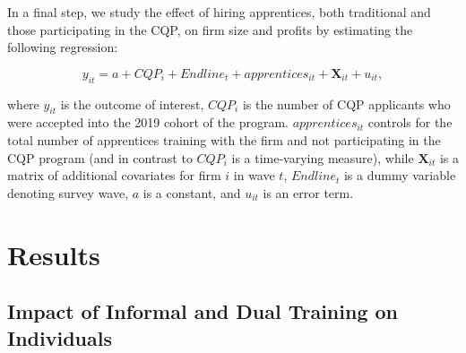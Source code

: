 \documentclass[
  11pt,
a4paper
]{article}
\begin{document}
In a final step, we study the effect of hiring apprentices, both traditional and those participating in the CQP, on firm size and profits by estimating the following regression:

\[ y_{it} =  a+CQP_i+{Endline}_t+apprentices_{it}+\mathbf{X}_{it}+u_{it}, \]

where \(y_{it}\) is the outcome of interest, \(CQP_i\) is the number of CQP applicants who were accepted into the 2019 cohort of the program. \(apprentices_{it}\) controls for the total number of apprentices training with the firm and not participating in the CQP program (and in contrast to \(CQP_i\) is a time-varying measure), while \(\mathbf{X}_{it}\) is a matrix of additional covariates for firm \(i\) in wave \(t\), \({Endline}_t\) is a dummy variable denoting survey wave, \(a\) is a constant, and \(u_{it}\) is an error term.

\FloatBarrier

\hypertarget{results}{%
\section{Results}\label{results}}

\hypertarget{appbenefits}{%
\subsection{Impact of Informal and Dual Training on Individuals}\label{appbenefits}}
\end{document}
